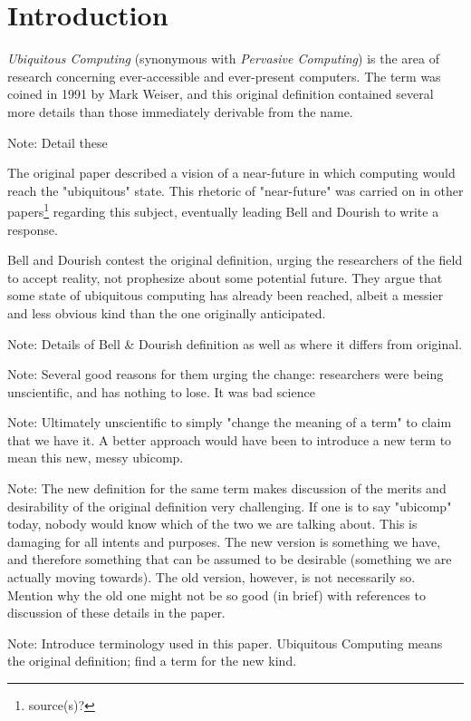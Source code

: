 \section{Introduction}

\emph{Ubiquitous Computing} (synonymous with \emph{Pervasive Computing}) is the area of research concerning
ever-accessible and ever-present computers. The term was coined in 1991 by Mark Weiser, and this original
definition contained several more details than those immediately derivable from the name.

Note: Detail these\cite{weiser91}

The original paper described a vision of a near-future in which computing would reach the "ubiquitous" state.
This rhetoric of "near-future" was carried on in other papers\footnote{source(s)?} regarding this subject,
eventually leading Bell and Dourish to write a response.

Bell and Dourish contest the original definition, urging the researchers of the field to accept reality, not
prophesize about some potential future. They argue that some state of ubiquitous computing has already been
reached, albeit a messier and less obvious kind than the one originally anticipated.\cite{bell07}

Note: Details of Bell \& Dourish definition as well as where it differs from original.

Note: Several good reasons for them urging the change: researchers were being unscientific, and has nothing to
lose. It was bad science

Note: Ultimately unscientific to simply "change the meaning of a term" to claim that we have it. A better approach
would have been to introduce a new term to mean this new, messy ubicomp.

Note: The new definition for the same term makes discussion of the merits and desirability of the original definition
very challenging. If one is to say "ubicomp" today, nobody would know which of the two we are talking about. This
is damaging for all intents and purposes. The new version is something we have, and therefore something that can be
assumed to be desirable (something we are actually moving towards). The old version, however, is not necessarily so.
Mention why the old one might not be so good (in brief) with references to discussion of these details in the paper.

Note: Introduce terminology used in this paper. Ubiquitous Computing means the original definition; find a term for the
new kind.